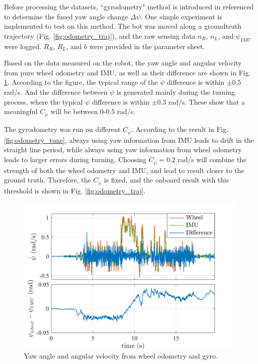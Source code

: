Before processing the datasets, ``gyrodometry" method is introduced in \cite{borenstein1996gyrodometry} referenced to determine the fused yaw angle change \(\Delta \psi\). One simple experiment is implemented to test on this method. The  bot  was  moved  along  a  groundtruth trajectory (Fig. \ref{fig:odometry_traj}), and the raw sensing data \(n_R\), \(n_L\), and \(\dot{\psi}_{IMU}\) were logged. \(R_R\), \(R_L\), and \(b\) were provided in the parameter sheet.

Based on the data measured on the robot, the yaw angle and angular velocity from pure wheel odometry and IMU, as well as their difference are shown in Fig. \ref{fig:odometry_angle_diff}. According to the figure, the typical range of the \(\dot{\psi}\) difference is within \(\pm\)0.5 rad/s. And the difference between \(\psi\) is generated mainly during the turning process, where the typical \(\dot{\psi}\) difference is within \(\pm\)0.3 rad/s. These show that a meaningful \(C_{\dot{\psi}}\) will be between 0-0.5 rad/s.

The gyrodometry was run on different \(C_{\dot{\psi}}\). According to the result in Fig. \ref{fig:odometry_tune}, always using yaw information from IMU leads to drift in the straight line period, while always using yaw information from wheel odometry leads to larger errors during turning. Choosing \(C_{\dot{\psi}} = 0.2\) rad/s will combine the strength of both the wheel odometry and IMU, and lead to result closer to the ground truth. Therefore, the \(C_{\dot{\psi}}\) is fixed, and the onboard result with this threshold is shown in Fig. \ref{fig:odometry_traj}.

\begin{figure}[hbt!]
    \centering
    \includegraphics[width = 1.0\linewidth]{media/odometry_angle_diff.png}
    \caption{Yaw angle and angular velocity from wheel odometry and gyro.}
    \label{fig:odometry_angle_diff}
\end{figure}

